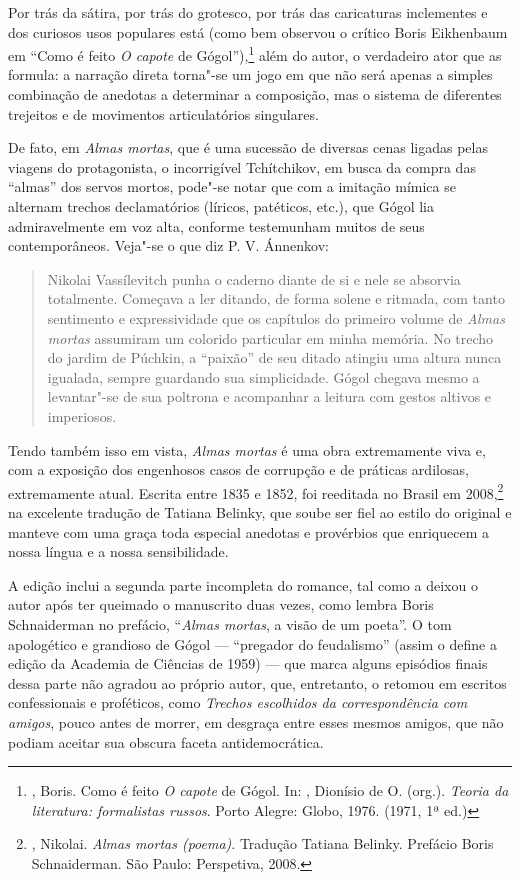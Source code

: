 Por trás da sátira, por trás do grotesco, por trás das caricaturas
inclementes e dos curiosos usos populares está (como bem observou o crítico Boris Eikhenbaum em ``Como é feito \emph{O capote} de Gógol''),\footnote{, Boris. Como é feito \emph{O capote} de Gógol. In: , Dionísio de O. (org.). \emph{Teoria da literatura: formalistas russos}. Porto Alegre: Globo, 1976. (1971, 1ª ed.)} além do autor, o verdadeiro ator que as formula: a narração direta torna"-se um jogo em que não será apenas a simples combinação de anedotas a determinar a composição, mas o sistema de diferentes trejeitos e de movimentos articulatórios singulares. 

De fato, em \emph{Almas mortas}, que é uma sucessão de diversas cenas ligadas pelas viagens do protagonista, o incorrigível Tchítchikov, em busca da compra das ``almas'' dos servos mortos, pode"-se notar que com a imitação mímica se alternam trechos declamatórios (líricos, patéticos, etc.), que Gógol lia admiravelmente em voz alta, conforme testemunham muitos de seus contemporâneos. Veja"-se o que diz P. V. Ánnenkov: 

\begin{quotation}
Nikolai Vassílevitch punha o caderno diante de si e nele se absorvia totalmente. Começava a ler ditando, de forma solene e ritmada, com tanto sentimento e expressividade que os capítulos do primeiro volume de \emph{Almas mortas} assumiram um colorido particular em minha memória. No trecho do jardim de Púchkin, a ``paixão'' de seu ditado atingiu uma altura nunca igualada, sempre guardando sua simplicidade. Gógol chegava mesmo a levantar"-se de sua poltrona e acompanhar a leitura com gestos altivos e imperiosos. 
\end{quotation}

Tendo também isso em vista, \emph{Almas mortas} é uma
obra extremamente viva e, com a exposição dos engenhosos casos de
corrupção e de práticas ardilosas, extremamente atual. Escrita entre
1835 e 1852, foi reeditada no Brasil em 2008,\footnote{, Nikolai. \emph{Almas mortas (poema)}. Tradução Tatiana Belinky. Prefácio Boris Schnaiderman. São Paulo: Perspetiva, 2008.} na excelente tradução de Tatiana Belinky, que soube ser fiel ao estilo do original e manteve com uma graça toda especial anedotas e provérbios que enriquecem a nossa língua e a nossa sensibilidade. 

A edição inclui a segunda parte incompleta do romance, tal como a deixou
o autor após ter queimado o manuscrito duas vezes, como lembra Boris Schnaiderman no prefácio, ``\emph{Almas mortas}, a visão de um poeta''. O tom apologético e grandioso de Gógol --- ``pregador do
feudalismo'' (assim o define a edição da Academia de Ciências de 1959) ---
que marca alguns episódios finais dessa parte não agradou ao próprio
autor, que, entretanto, o retomou em escritos confessionais e proféticos,
como \emph{Trechos escolhidos da correspondência com amigos}, pouco antes de
morrer, em desgraça entre esses mesmos amigos, que não podiam aceitar sua
obscura faceta antidemocrática. 



